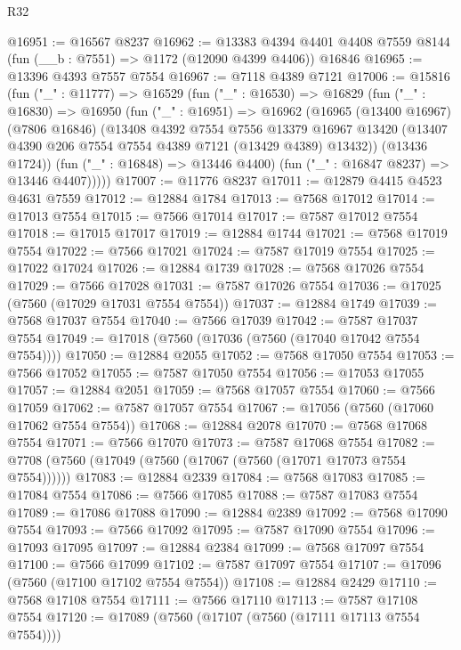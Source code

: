 \begin{lexlean}{R32}
\begin{coremodule}
@16951 := @16567 @8237
@16962 := @13383
    @4394
    @4401
    @4408
    @7559
    @8144
    (fun (__b : @7551) => @1172 (@12090 @4399 @4406))
    @16846
@16965 := @13396 @4393 @7557 @7554
@16967 := @7118 @4389 @7121
@17006 := @15816
    (fun ("_" : @11777) =>
    @16529
      (fun ("_" : @16530) =>
      @16829
        (fun ("_" : @16830) =>
        @16950
          (fun ("_" : @16951) =>
          @16962
            (@16965
              (@13400 @16967)
              (@7806 @16846)
              (@13408
                @4392
                @7554
                @7556
                @13379
                @16967
                @13420
                (@13407 @4390 @206 @7554 @7554 @4389 @7121 (@13429 @4389) @13432))
              (@13436 @1724))
            (fun ("_" : @16848) => @13446 @4400)
            (fun ("_" : @16847 @8237) => @13446 @4407)))))
@17007 := @11776 @8237
@17011 := @12879 @4415 @4523 @4631 @7559
@17012 := @12884 @1784
@17013 := @7568 @17012
@17014 := @17013 @7554
@17015 := @7566 @17014
@17017 := @7587 @17012 @7554
@17018 := @17015 @17017
@17019 := @12884 @1744
@17021 := @7568 @17019 @7554
@17022 := @7566 @17021
@17024 := @7587 @17019 @7554
@17025 := @17022 @17024
@17026 := @12884 @1739
@17028 := @7568 @17026 @7554
@17029 := @7566 @17028
@17031 := @7587 @17026 @7554
@17036 := @17025 (@7560 (@17029 @17031 @7554 @7554))
@17037 := @12884 @1749
@17039 := @7568 @17037 @7554
@17040 := @7566 @17039
@17042 := @7587 @17037 @7554
@17049 := @17018 (@7560 (@17036 (@7560 (@17040 @17042 @7554 @7554))))
@17050 := @12884 @2055
@17052 := @7568 @17050 @7554
@17053 := @7566 @17052
@17055 := @7587 @17050 @7554
@17056 := @17053 @17055
@17057 := @12884 @2051
@17059 := @7568 @17057 @7554
@17060 := @7566 @17059
@17062 := @7587 @17057 @7554
@17067 := @17056 (@7560 (@17060 @17062 @7554 @7554))
@17068 := @12884 @2078
@17070 := @7568 @17068 @7554
@17071 := @7566 @17070
@17073 := @7587 @17068 @7554
@17082 := @7708 (@7560 (@17049 (@7560 (@17067 (@7560 (@17071 @17073 @7554 @7554))))))
@17083 := @12884 @2339
@17084 := @7568 @17083
@17085 := @17084 @7554
@17086 := @7566 @17085
@17088 := @7587 @17083 @7554
@17089 := @17086 @17088
@17090 := @12884 @2389
@17092 := @7568 @17090 @7554
@17093 := @7566 @17092
@17095 := @7587 @17090 @7554
@17096 := @17093 @17095
@17097 := @12884 @2384
@17099 := @7568 @17097 @7554
@17100 := @7566 @17099
@17102 := @7587 @17097 @7554
@17107 := @17096 (@7560 (@17100 @17102 @7554 @7554))
@17108 := @12884 @2429
@17110 := @7568 @17108 @7554
@17111 := @7566 @17110
@17113 := @7587 @17108 @7554
@17120 := @17089 (@7560 (@17107 (@7560 (@17111 @17113 @7554 @7554))))

\end{coremodule}
\end{lexlean}
